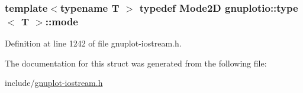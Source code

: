 \subsubsection[{\texorpdfstring{mode}{mode}}]{\setlength{\rightskip}{0pt plus 5cm}template$<$typename T $>$ typedef {\bf Mode2D} gnuplotio\+::type$<$ T $>$\+::{\bf mode}}\hypertarget{structgnuplotio_1_1_mode_auto_decoder_3_01_t_00_01typename_01boost_1_1enable__if__c_3_01_07_arra33ab7f3325313485a7f29355d9a819fc_a1574a7286cee13eedaeca8f40e7d0527}{}\label{structgnuplotio_1_1_mode_auto_decoder_3_01_t_00_01typename_01boost_1_1enable__if__c_3_01_07_arra33ab7f3325313485a7f29355d9a819fc_a1574a7286cee13eedaeca8f40e7d0527}


Definition at line 1242 of file gnuplot-\/iostream.\+h.



The documentation for this struct was generated from the following file\+:\begin{DoxyCompactItemize}
\item 
include/\hyperlink{gnuplot-iostream_8h}{gnuplot-\/iostream.\+h}\end{DoxyCompactItemize}
